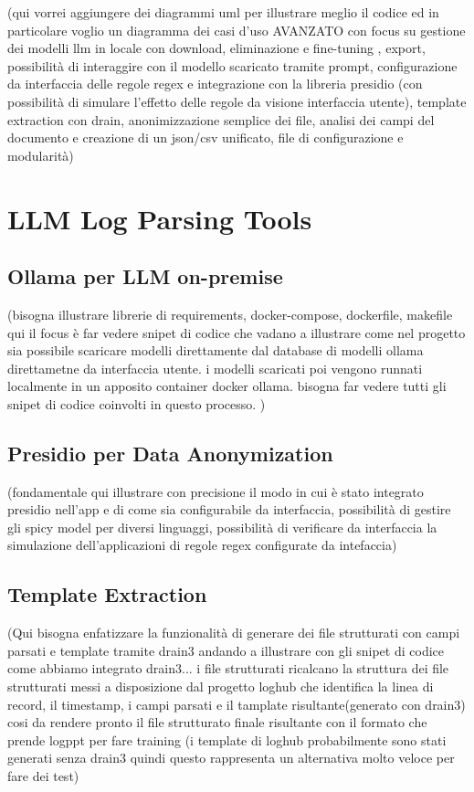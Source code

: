(qui vorrei aggiungere dei diagrammi uml per illustrare meglio il codice ed in  particolare voglio un  diagramma dei casi d'uso AVANZATO con focus su gestione dei modelli llm in locale con download, eliminazione e fine-tuning , export, possibilità di interaggire con il modello scaricato tramite prompt, configurazione da interfaccia delle regole regex e integrazione con la libreria presidio (con possibilità di simulare l'effetto delle regole da visione interfaccia utente), template extraction con drain, anonimizzazione semplice dei file, analisi dei campi del documento e creazione di un json/csv unificato, file di configurazione e modularità)

\section{LLM Log Parsing Tools}

\subsection{Ollama per LLM on-premise}

(bisogna illustrare librerie di requirements, docker-compose, dockerfile, makefile
qui il focus è far vedere snipet di codice che  vadano a illustrare come nel progetto sia possibile scaricare modelli direttamente dal database di modelli ollama direttametne da interfaccia utente. i modelli scaricati poi vengono runnati localmente in un apposito container docker ollama. bisogna far vedere tutti gli snipet di codice coinvolti in questo processo. )

\subsection{Presidio per Data Anonymization}
(fondamentale qui illustrare con precisione il modo in cui è stato integrato presidio nell'app e di come sia configurabile da interfaccia, possibilità di gestire gli spicy model per diversi linguaggi, possibilità di verificare da interfaccia la simulazione dell'applicazioni di regole regex configurate da intefaccia)

\subsection{Template Extraction}

(Qui bisogna enfatizzare la funzionalità di generare dei file strutturati con campi parsati e template tramite drain3 andando a illustrare con gli snipet di codice come abbiamo integrato drain3... i file strutturati ricalcano la struttura dei file strutturati messi a disposizione dal progetto loghub che identifica la linea di record, il timestamp, i campi parsati e il tamplate risultante(generato con drain3) cosi da rendere pronto il file strutturato finale risultante con il formato che prende logppt per fare training (i template di loghub probabilmente sono stati generati senza drain3 quindi questo rappresenta un alternativa molto veloce per fare dei test)